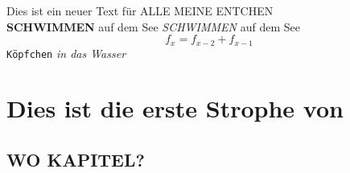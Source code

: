 \documentclass{article}
\begin{document}

\tableofcontents

\newpage



Dies ist ein neuer Text f\"ur 
ALLE MEINE ENTCHEN  \\
\textbf{SCHWIMMEN} auf
dem See
\newline
\textit{SCHWIMMEN} auf
dem See 
\newline
$$ f_x = f_{x-2} + f_{x-1}  $$ 
\texttt{K\"opfchen}
\textsl{in das Wasser}

\chapter{Dies ist die erste Strophe von }
\section{WO KAPITEL?}
\end{document}
